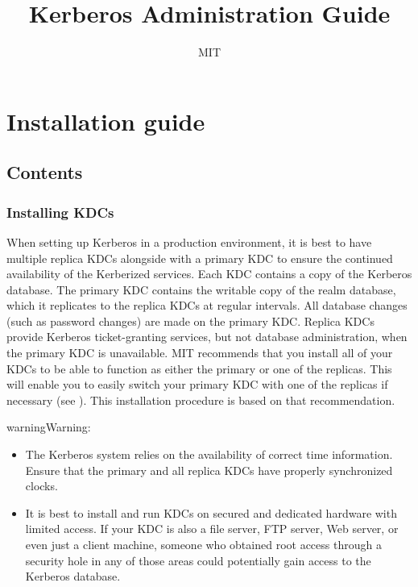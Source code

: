 \documentclass[letterpaper,10pt,english]{sphinxmanual}
\title{Kerberos Administration Guide}
\date{ }
\author{MIT}
\begin{document}
\maketitle
\sphinxtableofcontents
{}\label{\detokenize{admin/index::doc}}



\chapter{Installation guide}
\label{\detokenize{admin/install:for-administrators}}\label{\detokenize{admin/install::doc}}\label{\detokenize{admin/install:installation-guide}}

\section{Contents}
\label{\detokenize{admin/install:contents}}

\subsection{Installing KDCs}
\label{\detokenize{admin/install_kdc:installing-kdcs}}\label{\detokenize{admin/install_kdc::doc}}
When setting up Kerberos in a production environment, it is best to
have multiple replica KDCs alongside with a primary KDC to ensure the
continued availability of the Kerberized services.  Each KDC contains
a copy of the Kerberos database.  The primary KDC contains the
writable copy of the realm database, which it replicates to the
replica KDCs at regular intervals.  All database changes (such as
password changes) are made on the primary KDC.  Replica KDCs provide
Kerberos ticket-granting services, but not database administration,
when the primary KDC is unavailable.  MIT recommends that you install
all of your KDCs to be able to function as either the primary or one
of the replicas.  This will enable you to easily switch your primary
KDC with one of the replicas if necessary (see
{\hyperref[\detokenize{admin/install_kdc:switch-primary-replica}]{}}).  This installation procedure is based
on that recommendation.

\begin{sphinxadmonition}{warning}{Warning:}\begin{itemize}
\item {} 
The Kerberos system relies on the availability of correct time
information.  Ensure that the primary and all replica KDCs have
properly synchronized clocks.

\item {} 
It is best to install and run KDCs on secured and dedicated
hardware with limited access.  If your KDC is also a file
server, FTP server, Web server, or even just a client machine,
someone who obtained root access through a security hole in any
of those areas could potentially gain access to the Kerberos
database.

\end{itemize}
\end{sphinxadmonition}
\end{document}
